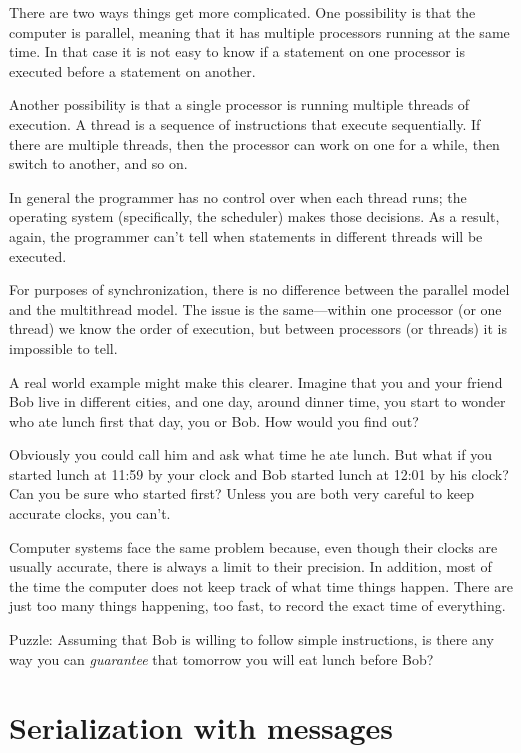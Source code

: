 \documentclass{book}
\begin{document}
There are two ways things get more complicated.  One possibility
is that the computer is parallel, meaning that it has multiple
processors running at the same time.  In that case it is not easy
to know if a statement on one processor is executed before a
statement on another.

Another possibility is that a single processor is running multiple
threads of execution.  A thread is a sequence of instructions
that execute sequentially.  If there are multiple threads, then
the processor can work on one for a while, then switch to
another, and so on.

In general the programmer has no control over when each thread runs;
the operating system (specifically, the scheduler) makes those
decisions.  As a result, again, the programmer can't tell when
statements in different threads will be executed.

For purposes of synchronization, there is no difference between the
parallel model and the multithread model.  The issue is the
same---within one processor (or one thread) we know the order of
execution, but between processors (or threads) it is impossible to
tell.

A real world example might make this clearer.  Imagine that you and
your friend Bob live in different cities, and one day, around dinner
time, you start to wonder who ate lunch first that day, you or Bob.
How would you find out?

Obviously you could call him and ask what time he ate lunch.  But what
if you started lunch at 11:59 by your clock and Bob started lunch at
12:01 by his clock?  Can you be sure who started first?  Unless you
are both very careful to keep accurate clocks, you can't.

Computer systems face the same problem because, even though their
clocks are usually accurate, there is always a limit to their
precision.  In addition, most of the time the computer does not keep
track of what time things happen.  There are just too many things
happening, too fast, to record the exact time of everything.

Puzzle: Assuming that Bob is willing to follow simple instructions, is
there any way you can {\em guarantee} that tomorrow you will eat lunch
before Bob?


\section {Serialization with messages}
\label{serialization}
\end{document}
